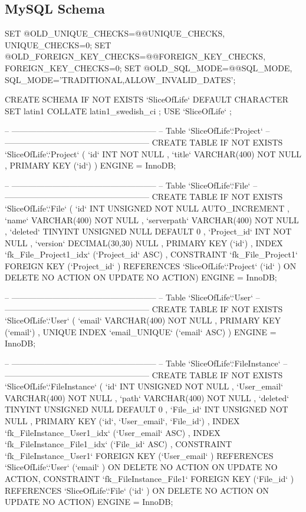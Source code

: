 \subsection{MySQL Schema}
\begin{spverbatim}
SET @OLD_UNIQUE_CHECKS=@@UNIQUE_CHECKS, UNIQUE_CHECKS=0;
SET @OLD_FOREIGN_KEY_CHECKS=@@FOREIGN_KEY_CHECKS, FOREIGN_KEY_CHECKS=0;
SET @OLD_SQL_MODE=@@SQL_MODE, SQL_MODE='TRADITIONAL,ALLOW_INVALID_DATES';

CREATE SCHEMA IF NOT EXISTS `SliceOfLife` DEFAULT CHARACTER SET latin1 COLLATE latin1_swedish_ci ;
USE `SliceOfLife` ;

-- -----------------------------------------------------
-- Table `SliceOfLife`.`Project`
-- -----------------------------------------------------
CREATE  TABLE IF NOT EXISTS `SliceOfLife`.`Project` (
  `id` INT NOT NULL ,
  `title` VARCHAR(400) NOT NULL ,
  PRIMARY KEY (`id`) )
ENGINE = InnoDB;


-- -----------------------------------------------------
-- Table `SliceOfLife`.`File`
-- -----------------------------------------------------
CREATE  TABLE IF NOT EXISTS `SliceOfLife`.`File` (
  `id` INT UNSIGNED NOT NULL AUTO_INCREMENT ,
  `name` VARCHAR(400) NOT NULL ,
  `serverpath` VARCHAR(400) NOT NULL ,
  `deleted` TINYINT UNSIGNED NULL DEFAULT 0 ,
  `Project_id` INT NOT NULL ,
  `version` DECIMAL(30,30) NULL ,
  PRIMARY KEY (`id`) ,
  INDEX `fk_File_Project1_idx` (`Project_id` ASC) ,
  CONSTRAINT `fk_File_Project1`
    FOREIGN KEY (`Project_id` )
    REFERENCES `SliceOfLife`.`Project` (`id` )
    ON DELETE NO ACTION
    ON UPDATE NO ACTION)
ENGINE = InnoDB;


-- -----------------------------------------------------
-- Table `SliceOfLife`.`User`
-- -----------------------------------------------------
CREATE  TABLE IF NOT EXISTS `SliceOfLife`.`User` (
  `email` VARCHAR(400) NOT NULL ,
  PRIMARY KEY (`email`) ,
  UNIQUE INDEX `email_UNIQUE` (`email` ASC) )
ENGINE = InnoDB;


-- -----------------------------------------------------
-- Table `SliceOfLife`.`FileInstance`
-- -----------------------------------------------------
CREATE  TABLE IF NOT EXISTS `SliceOfLife`.`FileInstance` (
  `id` INT UNSIGNED NOT NULL ,
  `User_email` VARCHAR(400) NOT NULL ,
  `path` VARCHAR(400) NOT NULL ,
  `deleted` TINYINT UNSIGNED NULL DEFAULT 0 ,
  `File_id` INT UNSIGNED NOT NULL ,
  PRIMARY KEY (`id`, `User_email`, `File_id`) ,
  INDEX `fk_FileInstance_User1_idx` (`User_email` ASC) ,
  INDEX `fk_FileInstance_File1_idx` (`File_id` ASC) ,
  CONSTRAINT `fk_FileInstance_User1`
    FOREIGN KEY (`User_email` )
    REFERENCES `SliceOfLife`.`User` (`email` )
    ON DELETE NO ACTION
    ON UPDATE NO ACTION,
  CONSTRAINT `fk_FileInstance_File1`
    FOREIGN KEY (`File_id` )
    REFERENCES `SliceOfLife`.`File` (`id` )
    ON DELETE NO ACTION
    ON UPDATE NO ACTION)
ENGINE = InnoDB;



\end{spverbatim}
